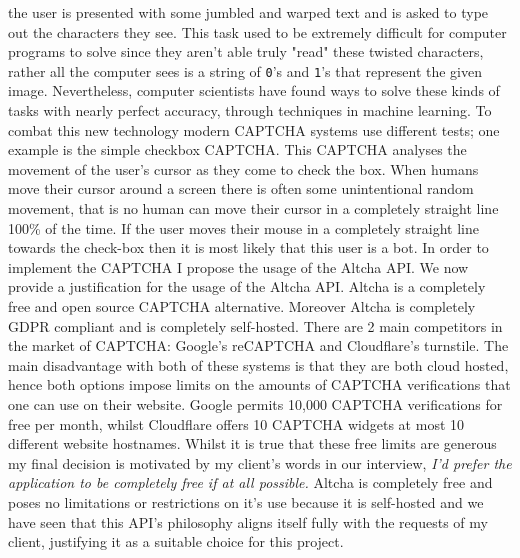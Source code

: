 the user is presented with some jumbled and warped text and is
asked to type out the characters they see. This task used to
be extremely difficult for computer programs to solve since
they aren't able truly "read" these twisted characters, rather
all the computer sees is a string of \texttt{0}'s and
\texttt{1}'s that represent the given image. Nevertheless,
computer scientists have found ways to solve these kinds of
tasks with nearly perfect accuracy, through techniques in
machine learning. To combat this new technology modern CAPTCHA
systems use different tests; one example is the simple
checkbox CAPTCHA. This CAPTCHA analyses the movement of the
user's cursor as they come to check the box. When humans move
their cursor around a screen there is often some unintentional
random movement, that is no human can move their cursor in a
completely straight line 100\% of the time. If the user moves
their mouse in a completely straight line towards the
check-box then it is most likely that this user is a bot. In
order to implement the CAPTCHA I propose the usage of the
Altcha API. We now provide a justification for the usage of
the Altcha API. Altcha is a completely free and open source
CAPTCHA alternative. Moreover Altcha is completely GDPR
compliant and is completely self-hosted. There are 2 main
competitors in the market of CAPTCHA: Google's reCAPTCHA and
Cloudflare's turnstile. The main disadvantage with both of
these systems is that they are both cloud hosted, hence both
options impose limits on the amounts of CAPTCHA verifications
that one can use on their website. Google permits
10,000 CAPTCHA verifications for free per month, whilst
Cloudflare offers 10 CAPTCHA widgets at most 10 different
website hostnames. Whilst it is true that these free limits
are generous my final decision is motivated by my client's
words in our interview, \textit{I'd prefer the application to
be completely free if at all possible.} Altcha is completely
free and poses no limitations or restrictions on it's use
because it is self-hosted and we have seen that this API's
philosophy aligns itself fully with the requests of my
client, justifying it as a suitable choice for this project.
\\ \vspace{0.2cm}

